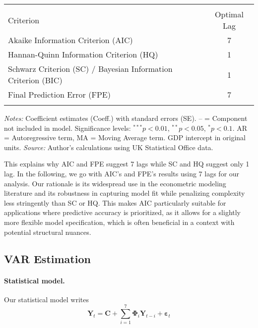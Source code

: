 \documentclass[
]{article}
\let\oldtable\table
\let\endoldtable\endtable
\renewenvironment{table}[1][H]{\oldtable[H]}{\endoldtable}
\begin{document}
	\begin{table}[ht]
		\centering
		\begin{threeparttable}
			\caption{\textsc{Optimal Lag Selection Based on Information Criteria}}\label{fig:lagselection}
			\begin{tabular}{lc}
				\\[-1.8ex]  \hline \hline  \\[-1.8ex] 
				{Criterion} & {Optimal Lag} \\
				\midrule
				Akaike Information Criterion (AIC) & 7 \\
				Hannan-Quinn Information Criterion (HQ)  & 1 \\
				Schwarz Criterion (SC) / Bayesian Information Criterion (BIC)  & 1 \\
				Final Prediction Error (FPE) & 7 \\
				\hline \hline  \\[-1.8ex] 
			\end{tabular}
		\end{threeparttable}
		\begin{minipage}{\textwidth}
			\footnotesize
			\textit{Notes:} Coefficient estimates (Coeff.) with standard errors (SE). 
			{--} = Component not included in model. Significance levels: $^{***}p<0.01$, $^{**}p<0.05$, $^{*}p<0.1$. 
			AR = Autoregressive term, MA = Moving Average term. GDP intercept in original units. 
			\textit{Source:} Author's calculations using UK Statistical Office data.
		\end{minipage}
	\end{table}
	This explains why AIC and FPE suggest
	7 lags while SC and HQ suggest only 1 lag. In the following, we go with AIC’s and 
	FPE’s results using 7 lags for our analysis. Our rationale is its widespread 
	use in the econometric modeling literature and its 
	robustness in capturing model fit while penalizing complexity less stringently 
	than SC or HQ. This makes AIC  particularly suitable for applications 
	where predictive accuracy is prioritized, as it allows for a slightly more 
	flexible model specification, which is often beneficial in a context 
	with potential structural nuances.
	
	\subsection{VAR Estimation}
	
	\paragraph*{Statistical model.}
	Our statistical model writes
	\begin{equation*}
		\bm{Y}_t = \bm{C} + \sum_{i=1}^7 \bm{\Phi}_i \bm{Y}_{t-i} + \bm{\varepsilon}_t
	\end{equation*}
	
\end{document}
